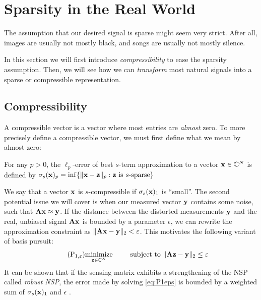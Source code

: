 






\section{Sparsity in the Real World}
The assumption that our desired signal is sparse might seem very strict. After all, images are usually not mostly black, and songs are usually not mostly silence.

In this section we will first introduce \textit{compressi\-bility} to ease the sparsity assumption. Then, we will see how we can \textit{transform} most natural signals into a sparse or compressible representation.


\subsection{Compressibility}

A compressible vector is a vector where most entries are \textit{almost} zero. To more precisely define a compressible vector, we must first define what we mean by almost zero:
\begin{definition} \label{def:compressibility}
	For any $ p > 0 $, the $ \ell_{p} $-error of best $ s $-term approximation to a vector $ \mathbf{x} \in \mathbb{C}^{N} $ is defined by
	\(
		\sigma_{s}(\mathbf{x})_{p} = \inf \{\lVert\mathbf{x} - \mathbf{z}\rVert_{p} : \mathbf{z} \text{ is } s\text{-sparse}\}
	\)
\end{definition}

We say that a vector $ \mathbf{x} $ is $ s $-compressible if $ \sigma_{s}(\mathbf{x})_{1} $ is ``small''. The second potential issue we will cover is when our measured vector $ \mathbf{y} $ contains some noise, such that $ \mathbf{A}\mathbf{x} \approx \mathbf{y} $. If the distance between the distorted measurements $ \mathbf{y} $ and the real, unbiased signal $ \mathbf{A}\mathbf{x} $ is bounded by a parameter $ \epsilon $, we can rewrite the approximation constraint as $ \lVert\mathbf{A}\mathbf{x} - \mathbf{y}\rVert_{2} < \varepsilon $. This motivates the following variant of basis pursuit:
\begin{equation}
	\tag{P$_{1, \epsilon}$}
	\label{eq:P1eps}
	\minimize{\z\in\Cx^{N}} \quad\subjectto \norm{\A\z - \y}_{2} \leq \epsilon
\end{equation}
It can be shown that if the sensing matrix exhibits a strengthening of the NSP called \textit{robust NSP}, the error made by solving \eqref{eq:P1eps} is bounded by a weighted sum of $ \sigma_{s}(\mathbf{x})_{1} $ and $ \epsilon $ \cite[Section~4.3]{foucart13intro}.

